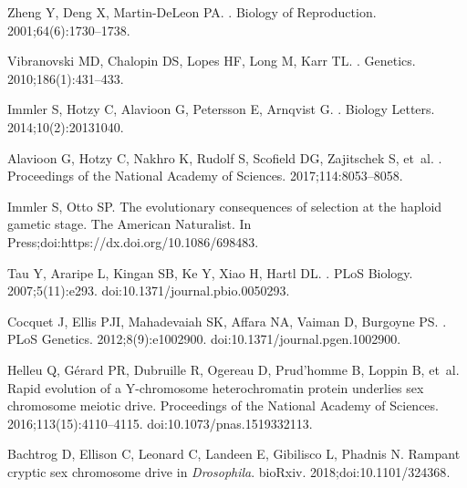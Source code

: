 \documentclass[10pt,letterpaper]{article}
\begin{document}
\begin{thebibliography}{100}
Zheng Y, Deng X, Martin-DeLeon PA.
.
\newblock Biology of Reproduction. 2001;64(6):1730--1738.

Vibranovski MD, Chalopin DS, Lopes HF, Long M, Karr TL.
.
\newblock Genetics. 2010;186(1):431--433.

Immler S, Hotzy C, Alavioon G, Petersson E, Arnqvist G.
.
\newblock Biology Letters. 2014;10(2):20131040.

Alavioon G, Hotzy C, Nakhro K, Rudolf S, Scofield DG, Zajitschek S, et~al.
.
\newblock Proceedings of the National Academy of Sciences. 2017;114:8053--8058.

Immler S, Otto SP.
\newblock The evolutionary consequences of selection at the haploid gametic
  stage.
\newblock The American Naturalist. In
  Press;doi:{https://dx.doi.org/10.1086/698483}.

Tau Y, Araripe L, Kingan SB, Ke Y, Xiao H, Hartl DL.
.
\newblock PLoS Biology. 2007;5(11):e293.
\newblock doi:{10.1371/journal.pbio.0050293}.

Cocquet J, Ellis PJI, Mahadevaiah SK, Affara NA, Vaiman D, Burgoyne PS.
.
\newblock PLoS Genetics. 2012;8(9):e1002900.
\newblock doi:{10.1371/journal.pgen.1002900}.

Helleu Q, G{\'e}rard PR, Dubruille R, Ogereau D, Prud{\textquoteright}homme B,
  Loppin B, et~al.
\newblock Rapid evolution of a Y-chromosome heterochromatin protein underlies
  sex chromosome meiotic drive.
\newblock Proceedings of the National Academy of Sciences.
  2016;113(15):4110--4115.
\newblock doi:{10.1073/pnas.1519332113}.

Bachtrog D, Ellison C, Leonard C, Landeen E, Gibilisco L, Phadnis N.
\newblock Rampant cryptic sex chromosome drive in \textit{Drosophila}.
\newblock bioRxiv. 2018;doi:{10.1101/324368}.


\end{thebibliography}
\end{document}
